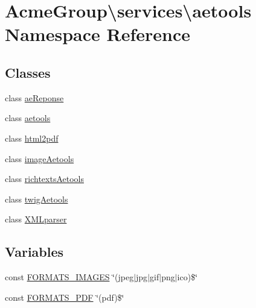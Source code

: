\hypertarget{namespace_acme_group_1_1services_1_1aetools}{\section{Acme\+Group\textbackslash{}services\textbackslash{}aetools Namespace Reference}
\label{namespace_acme_group_1_1services_1_1aetools}
}
\subsection*{Classes}
\begin{DoxyCompactItemize}
\item 
class \hyperlink{class_acme_group_1_1services_1_1aetools_1_1ae_reponse}{ae\+Reponse}
\item 
class \hyperlink{class_acme_group_1_1services_1_1aetools_1_1aetools}{aetools}
\item 
class \hyperlink{class_acme_group_1_1services_1_1aetools_1_1html2pdf}{html2pdf}
\item 
class \hyperlink{class_acme_group_1_1services_1_1aetools_1_1image_aetools}{image\+Aetools}
\item 
class \hyperlink{class_acme_group_1_1services_1_1aetools_1_1richtexts_aetools}{richtexts\+Aetools}
\item 
class \hyperlink{class_acme_group_1_1services_1_1aetools_1_1twig_aetools}{twig\+Aetools}
\item 
class \hyperlink{class_acme_group_1_1services_1_1aetools_1_1_x_m_lparser}{X\+M\+Lparser}
\end{DoxyCompactItemize}
\subsection*{Variables}
\begin{DoxyCompactItemize}
\item 
const \hyperlink{namespace_acme_group_1_1services_1_1aetools_a0849bde87c435d7dae7aa47884ea40d9}{F\+O\+R\+M\+A\+T\+S\+\_\+\+I\+M\+A\+G\+E\+S} \char`\"{}(jpeg$\vert$jpg$\vert$gif$\vert$png$\vert$ico)\$\char`\"{}
\item 
const \hyperlink{namespace_acme_group_1_1services_1_1aetools_ab6aff9e01b34cb1b72532617114cfc28}{F\+O\+R\+M\+A\+T\+S\+\_\+\+P\+D\+F} \char`\"{}(pdf)\$\char`\"{}
\end{DoxyCompactItemize}


